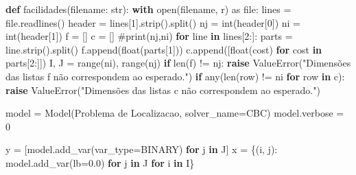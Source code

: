 \documentclass[
  letterpaper,
  DIV=11,
  numbers=noendperiod]{scrartcl}
\newenvironment{Shaded}{\begin{snugshade}}{\end{snugshade}}
\newcommand{\BuiltInTok}[1]{\textcolor[rgb]{0.00,0.23,0.31}{#1}}
\newcommand{\CommentTok}[1]{\textcolor[rgb]{0.37,0.37,0.37}{#1}}
\newcommand{\ControlFlowTok}[1]{\textcolor[rgb]{0.00,0.23,0.31}{\textbf{#1}}}
\newcommand{\DecValTok}[1]{\textcolor[rgb]{0.68,0.00,0.00}{#1}}
\newcommand{\FloatTok}[1]{\textcolor[rgb]{0.68,0.00,0.00}{#1}}
\newcommand{\ImportTok}[1]{\textcolor[rgb]{0.00,0.46,0.62}{#1}}
\newcommand{\KeywordTok}[1]{\textcolor[rgb]{0.00,0.23,0.31}{\textbf{#1}}}
\newcommand{\NormalTok}[1]{\textcolor[rgb]{0.00,0.23,0.31}{#1}}
\newcommand{\OperatorTok}[1]{\textcolor[rgb]{0.37,0.37,0.37}{#1}}
\newcommand{\PreprocessorTok}[1]{\textcolor[rgb]{0.68,0.00,0.00}{#1}}
\newcommand{\StringTok}[1]{\textcolor[rgb]{0.13,0.47,0.30}{#1}}
\begin{document}
\begin{Shaded}
\begin{Highlighting}[]
\KeywordTok{def}\NormalTok{ facilidades(filename: }\BuiltInTok{str}\NormalTok{):}
    \ControlFlowTok{with} \BuiltInTok{open}\NormalTok{(filename, }\StringTok{\textquotesingle{}r\textquotesingle{}}\NormalTok{) }\ImportTok{as} \BuiltInTok{file}\NormalTok{:}
\NormalTok{        lines }\OperatorTok{=} \BuiltInTok{file}\NormalTok{.readlines()}
\NormalTok{    header }\OperatorTok{=}\NormalTok{ lines[}\DecValTok{1}\NormalTok{].strip().split()}
\NormalTok{    nj }\OperatorTok{=} \BuiltInTok{int}\NormalTok{(header[}\DecValTok{0}\NormalTok{])}
\NormalTok{    ni }\OperatorTok{=} \BuiltInTok{int}\NormalTok{(header[}\DecValTok{1}\NormalTok{])}
\NormalTok{    f }\OperatorTok{=}\NormalTok{ []}
\NormalTok{    c }\OperatorTok{=}\NormalTok{ []}
    \CommentTok{\#print(nj,ni)}
    \ControlFlowTok{for}\NormalTok{ line }\KeywordTok{in}\NormalTok{ lines[}\DecValTok{2}\NormalTok{:]:}
\NormalTok{        parts }\OperatorTok{=}\NormalTok{ line.strip().split()}
\NormalTok{        f.append(}\BuiltInTok{float}\NormalTok{(parts[}\DecValTok{1}\NormalTok{]))}
\NormalTok{        c.append([}\BuiltInTok{float}\NormalTok{(cost) }\ControlFlowTok{for}\NormalTok{ cost }\KeywordTok{in}\NormalTok{ parts[}\DecValTok{2}\NormalTok{:]])}
\NormalTok{    I, J }\OperatorTok{=} \BuiltInTok{range}\NormalTok{(ni), }\BuiltInTok{range}\NormalTok{(nj)}
    \ControlFlowTok{if} \BuiltInTok{len}\NormalTok{(f) }\OperatorTok{!=}\NormalTok{ nj:}
        \ControlFlowTok{raise} \PreprocessorTok{ValueError}\NormalTok{(}\StringTok{"Dimensões das listas \textquotesingle{}f\textquotesingle{}\textquotesingle{} não correspondem ao esperado."}\NormalTok{)}
    \ControlFlowTok{if} \BuiltInTok{any}\NormalTok{(}\BuiltInTok{len}\NormalTok{(row) }\OperatorTok{!=}\NormalTok{ ni }\ControlFlowTok{for}\NormalTok{ row }\KeywordTok{in}\NormalTok{ c):}
        \ControlFlowTok{raise} \PreprocessorTok{ValueError}\NormalTok{(}\StringTok{"Dimensões das listas \textquotesingle{}c\textquotesingle{} não correspondem ao esperado."}\NormalTok{)}
    
\NormalTok{    model }\OperatorTok{=}\NormalTok{ Model(}\StringTok{\textquotesingle{}Problema de Localizacao\textquotesingle{}}\NormalTok{, solver\_name}\OperatorTok{=}\NormalTok{CBC)}
\NormalTok{    model.verbose }\OperatorTok{=} \DecValTok{0}
    
\NormalTok{    y }\OperatorTok{=}\NormalTok{ [model.add\_var(var\_type}\OperatorTok{=}\NormalTok{BINARY) }\ControlFlowTok{for}\NormalTok{ j }\KeywordTok{in}\NormalTok{ J]}
\NormalTok{    x }\OperatorTok{=}\NormalTok{ \{(i, j): model.add\_var(lb}\OperatorTok{=}\FloatTok{0.0}\NormalTok{) }\ControlFlowTok{for}\NormalTok{ j }\KeywordTok{in}\NormalTok{ J }\ControlFlowTok{for}\NormalTok{ i }\KeywordTok{in}\NormalTok{ I\}}
    

\end{Highlighting}
\end{Shaded}
\end{document}
